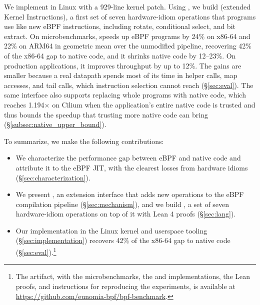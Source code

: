 We implement \tool in Linux with a 929-line kernel patch.
Using \tool, we build \lang (extended Kernel  Instructions), a first set of seven hardware-idiom operations that programs use like new eBPF instructions, including rotate, conditional select, and bit extract.
On microbenchmarks, \lang speeds up eBPF programs by 24\% on x86-64 and 22\% on ARM64 in geometric mean over the unmodified pipeline, recovering 42\% of the x86-64 gap to native code, and it shrinks native code by 12--23\%.
On production applications, it improves throughput by up to 12\%. The gains are smaller because a real datapath spends most of its time in helper calls, map accesses, and tail calls, which instruction selection cannot reach (\S\ref{sec:eval}).
The same interface also supports replacing whole programs with native code, which reaches 1.194$\times$ on Cilium when the application's entire native code is trusted and thus bounds the speedup that trusting more native code can bring (\S\ref{subsec:native_upper_bound}).

To summarize, we make the following contributions:
\begin{itemize}
    \item We characterize the performance gap between eBPF and native code and attribute it to the eBPF JIT, with the clearest losses from hardware idioms (\S\ref{sec:characterization}).
    \item We present \tool, an extension interface that adds new operations to the eBPF compilation pipeline (\S\ref{sec:mechanism}), and we build \lang, a set of seven hardware-idiom operations on top of it with Lean 4 proofs (\S\ref{sec:lang}).
    \item Our implementation in the Linux kernel and userspace tooling (\S\ref{sec:implementation}) recovers 42\% of the x86-64 gap to native code (\S\ref{sec:eval}).\footnote{The artifact, with the microbenchmarks, the \tool and \lang implementations, the Lean proofs, and instructions for reproducing the experiments, is available at \url{https://github.com/eunomia-bpf/bpf-benchmark}.}
\end{itemize}
